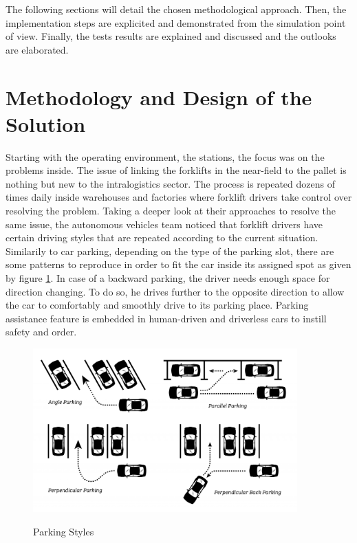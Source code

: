 The following sections will detail the chosen methodological approach. Then, the implementation steps are 
explicited and demonstrated from the simulation point of view. Finally, the tests results are explained 
and discussed and the outlooks are elaborated. 

\section{Methodology and Design of the Solution}

Starting with the operating environment, the stations, the focus was on the problems inside. The issue of linking 
the forklifts in the near-field to the pallet is nothing but new to the intralogistics sector. 
The process is repeated dozens of times daily inside warehouses and factories where forklift drivers take control over 
resolving the problem. Taking a deeper look at their approaches to resolve the same issue, the autonomous vehicles team 
noticed that forklift drivers have certain driving styles that are repeated according to the current situation.
Similarily to car parking, depending on the type of the parking slot, there are some patterns to reproduce in order to fit 
the car inside its assigned spot as given by figure \ref{Parking Styles}. In case of a backward parking, the driver needs 
enough space for direction changing. To do so, he drives further to the opposite direction to allow 
the car to comfortably and smoothly drive to its parking place.
Parking assistance feature is embedded in human-driven and driverless cars to instill safety and order.

\begin{figure}
    [H]
    \begin{center}
    \includegraphics[width=4in]{images/Chap2/perpendicular-parking-a-lot-scaled.jpg}\\
    \caption{Parking Styles}
    \label{Parking Styles}
    \end{center}
\end{figure}

